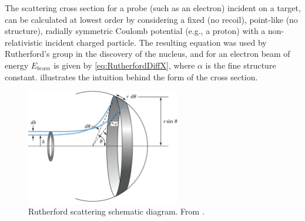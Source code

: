             
        
        

        


        The scattering cross section for a probe (such as an electron) incident on a target, can be calculated at lowest order by considering a fixed (no recoil), point-like (no structure),  radially symmetric Coulomb potential (e.g., a proton) with a non-relativistic incident charged particle. The resulting equation was used by Rutherford's group in the discovery of the nucleus, and for an electron beam of energy  $E_{beam}$ is given by \eqref{eq:RutherfordDiffX}, where $\alpha$ is the fine structure constant.  illustrates the intuition behind the form of the cross section. 


        \begin{figure}[H]
            \centering
            \includegraphics[width=0.6\textwidth]{Chapters/Ch1-Intro/Ch1-Sec1-Background/pics/GreatRutherford1.png}
            \caption[Rutherford scattering schematic]{Rutherford scattering schematic diagram. From \parencite{Fraser2011Rutherford342}. }
            \label{fig:ruth_scattering_diagram}
        \end{figure}


